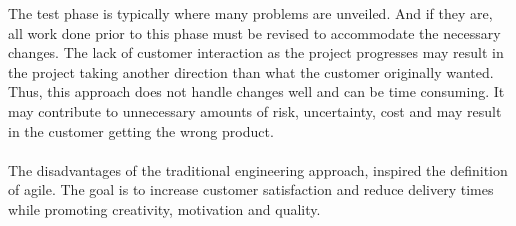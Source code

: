 \noindent The test phase is typically where many problems are unveiled. And if they are, all work done prior to this phase must be revised to accommodate the necessary changes. The lack of customer interaction as the project progresses may result in the project taking another direction than what the customer originally wanted. Thus, this approach does not handle changes well and can be time consuming. It may contribute to unnecessary amounts of risk, uncertainty, cost and may result in the customer getting the wrong product.\\ 
\\
The disadvantages of the traditional engineering approach, inspired the definition of agile.
The goal is to increase customer satisfaction and reduce delivery times while promoting creativity, motivation and quality. 






